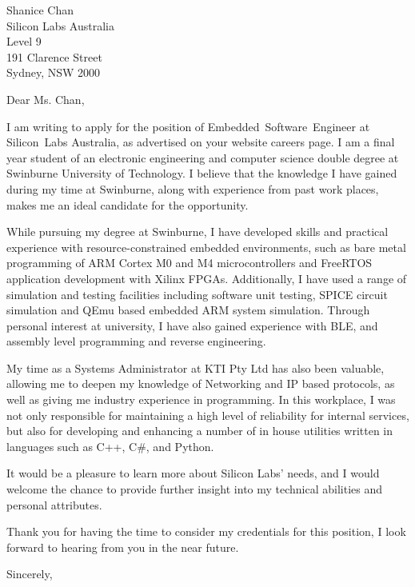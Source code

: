 \documentclass[
    backaddress=false,
    foldmarks=false,
    fromalign=right,
    fromrule,
    fromphone,
    fromemail,
    parskip=half,
    refline=nodate
]{scrlttr2}
\begin{document}
    


    \renewcommand*\raggedsignature{\raggedright}

    \begin{letter}{%
        Shanice Chan           \\
        Silicon Labs Australia \\
        Level 9                \\
        191 Clarence Street    \\
        Sydney, NSW 2000}
        \opening{Dear Ms. Chan,}
        \raggedbottom
        I am writing to apply for the position of Embedded~Software~Engineer at Silicon~Labs Australia, as advertised on your website careers page. I am a final year student of an electronic engineering and computer science double degree at Swinburne University of Technology. I believe that the knowledge I have gained during my time at Swinburne, along with experience from past work places, makes me an ideal candidate for the opportunity.

        While pursuing my degree at Swinburne, I have developed skills and practical experience with resource-constrained embedded environments, such as bare metal programming of ARM Cortex M0 and M4 microcontrollers and FreeRTOS application development with Xilinx FPGAs. Additionally, I have used a range of simulation and testing facilities including software unit testing, SPICE circuit simulation and QEmu based embedded ARM system simulation. Through personal interest at university, I have also gained experience with BLE, and assembly level programming and reverse engineering.

        My time as a Systems Administrator at KTI Pty Ltd has also been valuable, allowing me to deepen my knowledge of Networking and IP based protocols, as well as giving me industry experience in programming. In this workplace, I was not only responsible for maintaining a high level of reliability for internal services, but also for developing and enhancing a number of in house utilities written in languages such as C++, C\#, and Python.
        
        It would be a pleasure to learn more about Silicon Labs' needs, and I would welcome the chance to provide further insight into my technical abilities and personal attributes.

        Thank you for having the time to consider my credentials for this position, I look forward to hearing from you in the near future.

        \closing{Sincerely,}
    \end{letter}
\end{document}
